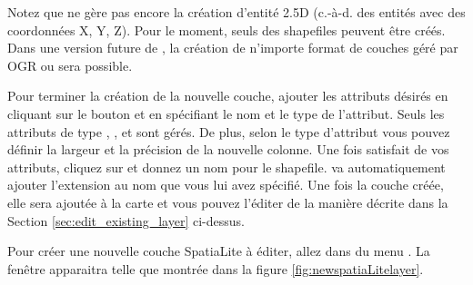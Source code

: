 Notez que \qg ne gère pas encore la création d'entité 2.5D (c.-à-d. des entités avec des coordonnées X, Y, Z). Pour le moment, seuls des shapefiles peuvent être créés. Dans une version future de \qg, la création de n'importe format de couches géré par OGR ou \psq sera possible.

Pour terminer la création de la nouvelle couche, ajouter les attributs désirés en cliquant sur le bouton  et en spécifiant le nom et le type de l'attribut. Seuls les attributs de type , , et  sont gérés. De plus, selon le type d'attribut vous pouvez définir la largeur et la précision de la nouvelle colonne. Une fois satisfait de vos attributs, cliquez sur  et donnez un nom pour le shapefile. \qg va automatiquement ajouter l'extension  au nom que vous lui avez spécifié. Une fois la couche créée, elle sera ajoutée à la carte et vous pouvez l'éditer de la manière décrite dans la Section \ref{sec:edit_existing_layer} ci-dessus.

\label{sec:create spatialite}

Pour créer une nouvelle couche SpatiaLite à éditer, allez dans  du menu . La fenêtre  apparaitra telle que montrée dans la figure \ref{fig:newspatiaLitelayer}.

